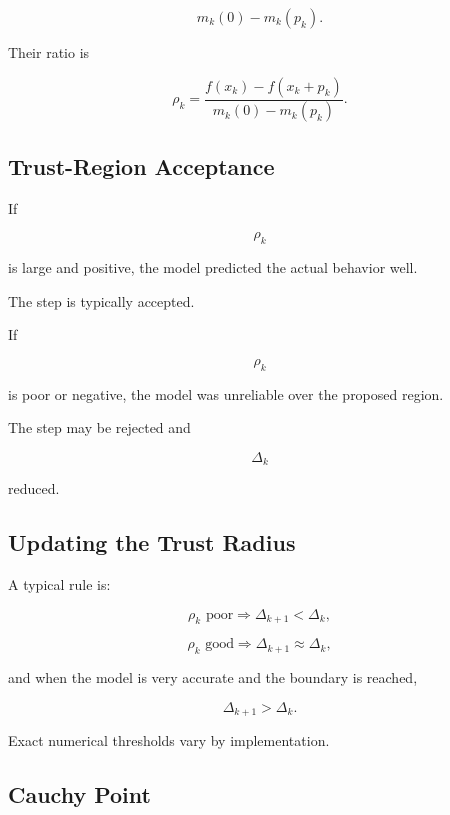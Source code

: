 \[
\boxed{
m_k(0)-m_k(p_k).
}
\]

Their ratio is

\[
\boxed{
\rho_k
=
\frac{
f(x_k)-f(x_k+p_k)
}{
m_k(0)-m_k(p_k)
}.
}
\]

\subsection{Trust-Region Acceptance}
\label{subsec:trust-region-acceptance}

If

\[
\rho_k
\]

is large and positive, the model predicted the actual behavior well.

The step is typically accepted.

If

\[
\rho_k
\]

is poor or negative, the model was unreliable over the proposed region.

The step may be rejected and

\[
\Delta_k
\]

reduced.

\subsection{Updating the Trust Radius}
\label{subsec:trust-radius-update}

A typical rule is:

\[
\boxed{
\rho_k\text{ poor}
\Rightarrow
\Delta_{k+1}<\Delta_k,
}
\]

\[
\boxed{
\rho_k\text{ good}
\Rightarrow
\Delta_{k+1}\approx\Delta_k,
}
\]

and when the model is very accurate and the boundary is reached,

\[
\boxed{
\Delta_{k+1}>\Delta_k.
}
\]

Exact numerical thresholds vary by implementation.

\subsection{Cauchy Point}
\label{subsec:trust-region-cauchy-point}

